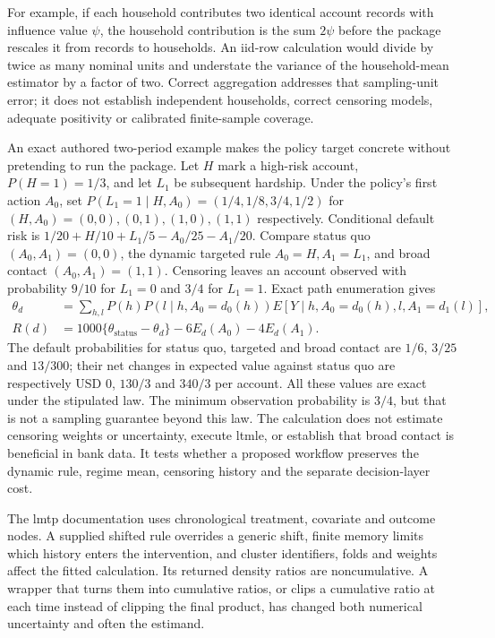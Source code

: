 For example, if each household contributes two identical account records with
influence value $\psi$, the household contribution is the sum $2\psi$ before
the package rescales it from records to households. An iid-row calculation
would divide by twice as many nominal units and understate the variance of the
household-mean estimator by a factor of two. Correct aggregation addresses
that sampling-unit error; it does not establish independent households,
correct censoring models, adequate positivity or calibrated finite-sample
coverage.

An exact authored two-period example makes the policy target concrete without
pretending to run the package. Let $H$ mark a high-risk account,
$P(H=1)=1/3$, and let $L_1$ be subsequent hardship. Under the policy's first
action $A_0$, set
$P(L_1=1\mid H,A_0)=(1/4,1/8,3/4,1/2)$ for
$(H,A_0)=(0,0),(0,1),(1,0),(1,1)$ respectively. Conditional default risk is
$1/20+H/10+L_1/5-A_0/25-A_1/20$. Compare status quo
$(A_0,A_1)=(0,0)$, the dynamic targeted rule $A_0=H,A_1=L_1$, and broad
contact $(A_0,A_1)=(1,1)$. Censoring leaves an account observed with probability
$9/10$ for $L_1=0$ and $3/4$ for $L_1=1$. Exact path enumeration gives
\begin{align}
 \theta_d &= \sum_{h,l}P(h)P(l\mid h,A_0=d_0(h))
   E[Y\mid h,A_0=d_0(h),l,A_1=d_1(l)],\\
 R(d) &=1000\{\theta_{\mathrm{status}}-\theta_d\}
       -6E_d(A_0)-4E_d(A_1).
\end{align}
The default probabilities for status quo, targeted and broad contact are
$1/6$, $3/25$ and $13/300$; their net changes in expected value against
status quo are respectively USD $0$, $130/3$ and $340/3$ per account. All
these values are exact under the stipulated law. The minimum observation
probability is $3/4$, but that is not a sampling guarantee beyond this law.
The calculation does not estimate censoring weights or uncertainty, execute
ltmle, or establish that broad contact is beneficial in bank data. It tests
whether a proposed workflow preserves the dynamic rule, regime mean, censoring
history and the separate decision-layer cost.

The lmtp documentation uses chronological treatment, covariate and outcome
nodes. A supplied shifted rule overrides a generic shift, finite memory limits
which history enters the intervention, and cluster identifiers, folds and
weights affect the fitted calculation. Its returned density ratios are
noncumulative. A wrapper that turns them into cumulative ratios, or clips a
cumulative ratio at each time instead of clipping the final product, has
changed both numerical uncertainty and often the estimand.\citep{sw_lmtp}


